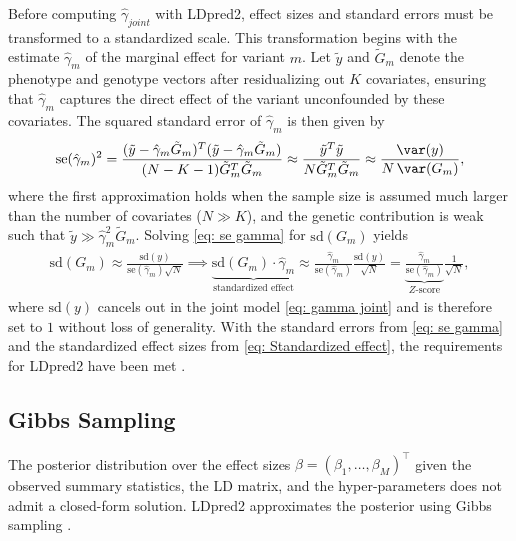 Before computing $\hat{\gamma}_{joint}$ with LDpred2, effect sizes and standard errors must be transformed to a standardized scale. This transformation begins with the estimate $\hat{\gamma}_m$ of the marginal effect for variant $m$. Let $\tilde{y}$ and $\tilde{G}_m$ denote the phenotype and genotype vectors after residualizing out $K$ covariates, ensuring that $\hat{\gamma}_m$ captures the direct effect of the variant unconfounded by these covariates. The squared standard error of $\hat{\gamma}_m$ is then given by
\begin{align} \label{eq: se gamma}
\text{se}(\hat{\gamma}_m)^2 = \frac{(\tilde{y} - \hat{\gamma}_m \tilde{G}_m)^T (\tilde{y} - \hat{\gamma}_m \tilde{G}_m)}{(N-K-1)\tilde{G}_m^T \tilde{G}_m} \approx \frac{\tilde{y}^T \tilde{y}}{N \tilde{G}_m^T \tilde{G}_m} \approx \frac{\var(y)}{N\,\var(G_m)},
\end{align}
where the first approximation holds when the sample size is assumed much larger than the number of covariates ($N \gg K$), and the genetic contribution is weak such that $\tilde{y} \gg \hat{\gamma}_m^2 \tilde{G}_m$. Solving \eqref{eq: se gamma} for $\text{sd}(G_m)$ yields
\begin{align}\label{eq: Standardized effect}
\text{sd}(G_m) \approx \frac{\text{sd}(y)}{\text{se}(\hat{\gamma}_m)\sqrt{N}} \implies
\underbrace{\text{sd}(G_m) \cdot \hat{\gamma}_m}_{\text{standardized effect}} \approx \frac{\hat{\gamma}_m}{\text{se}(\hat{\gamma}_m)}\frac{\text{sd}(y)}{\sqrt{N}} = \underbrace{\frac{\hat{\gamma}_m}{\text{se}(\hat{\gamma}_m)}}_{Z\text{-score}} \frac{1}{\sqrt{N}},
\end{align}
where $\text{sd}(y)$ cancels out in the joint model \eqref{eq: gamma joint} and is therefore set to $1$ without loss of generality. With the standard errors from \eqref{eq: se gamma} and the standardized effect sizes from \eqref{eq: Standardized effect}, the requirements for LDpred2 have been met \citep{Prive2020}.



\subsection{Gibbs Sampling}
\label{sec:gibbs}

The posterior distribution over the effect sizes $\beta = (\beta_1, \dots, \beta_M)^\top$ given the observed summary statistics, the LD matrix, and the hyper-parameters does not admit a closed-form solution. LDpred2 approximates the posterior using Gibbs sampling \citep{GemanGeman1984, GelmanBDA2013}.

